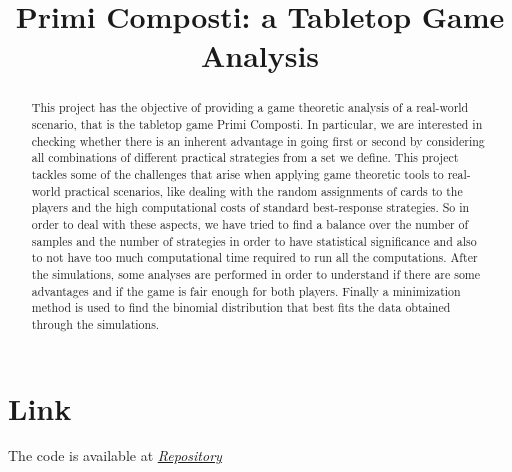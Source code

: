 \documentclass[conference]{IEEEtran}
\begin{document}
\title{Primi Composti: a Tabletop Game Analysis}

\author{
\and
{}
\and
{}
}
\maketitle

\begin{abstract}
	This project has the objective of providing a game theoretic analysis of a real-world scenario, that is the tabletop game Primi Composti. In particular, we are interested in checking whether there is an inherent advantage in going first or second by considering all combinations of different practical strategies from a set we define.
	This project tackles some of the challenges that arise when applying game theoretic tools to real-world practical scenarios, like dealing with the random assignments of cards to the players and the high computational costs of standard best-response strategies. So in order to deal with these aspects, we have tried to find a balance over the number of samples and the number of strategies in order to have statistical significance and also to not have too much computational time required to run all the computations.
    After the simulations, some analyses are performed in order to understand if there are some advantages and if the game is fair enough for both players.
    Finally a minimization method is used to find the binomial distribution that best fits the data obtained through the simulations.
\end{abstract}






\section*{Link}
The code is available at \href{https://github.com/Sproc01/GT_PrimeComposite.git}{\textit{Repository}}
\end{document}
